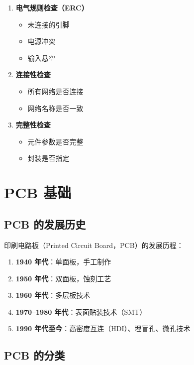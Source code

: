 \begin{enumerate}
  \item \textbf{电气规则检查（ERC）}
    \begin{itemize}
      \item 未连接的引脚
      \item 电源冲突
      \item 输入悬空
    \end{itemize}

  \item \textbf{连接性检查}
    \begin{itemize}
      \item 所有网络是否连接
      \item 网络名称是否一致
    \end{itemize}

  \item \textbf{完整性检查}
    \begin{itemize}
      \item 元件参数是否完整
      \item 封装是否指定
    \end{itemize}
\end{enumerate}

\section{PCB 基础}

\subsection{PCB 的发展历史}

印刷电路板（Printed Circuit Board，PCB）的发展历程：

\begin{enumerate}
  \item \textbf{1940 年代}：单面板，手工制作
  \item \textbf{1950 年代}：双面板，蚀刻工艺
  \item \textbf{1960 年代}：多层板技术
  \item \textbf{1970--1980 年代}：表面贴装技术（SMT）
  \item \textbf{1990 年代至今}：高密度互连（HDI）、埋盲孔、微孔技术
\end{enumerate}

\subsection{PCB 的分类}

